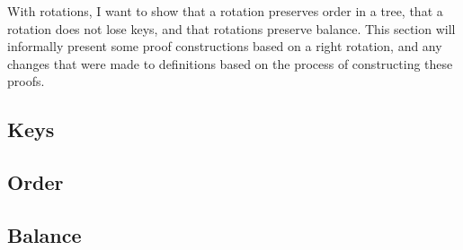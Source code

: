 With rotations, I want to show that a rotation preserves order in a tree, that a rotation does not lose keys, and that rotations preserve balance. This section will informally present some proof constructions based on a right rotation, and any changes that were made to definitions based on the process of constructing these proofs.

\subsection*{Keys}


\subsection*{Order}


\subsection*{Balance}
